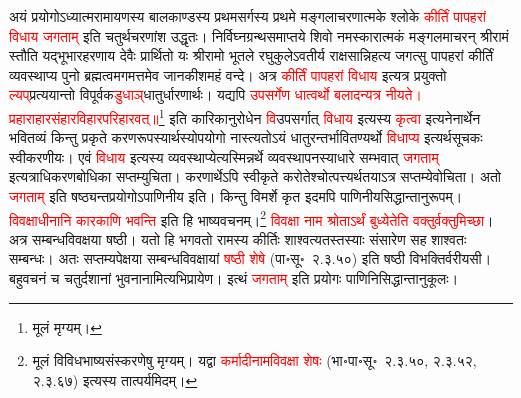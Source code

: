 \begin{sloppypar}\justifying\noindent\hspace{10mm} अयं प्रयोगोऽध्यात्म\-रामायणस्य बाल\-काण्डस्य प्रथम\-सर्गस्य प्रथमे मङ्गलाचरणात्मके श्लोके \textcolor{red}{कीर्तिं पाप\-हरां विधाय जगताम्‌} इति चतुर्थ\-चरणांश उद्धृतः। निर्विघ्न\-ग्रन्थ\-समाप्तये शिवो नमस्कारात्मकं मङ्गलमाचरन् श्रीरामं स्तौति यद्भू\-भार\-हरणाय देवैः प्रार्थितो यः श्रीरामो भूतले रघु\-कुलेऽवतीर्य राक्षसान्निहत्य जगत्सु पाप\-हरां कीर्तिं व्यवस्थाप्य पुनो ब्रह्मत्वमगमत्तमेव जानकीशमहं वन्दे। अत्र \textcolor{red}{कीर्तिं पाप\-हरां विधाय} इत्यत्र प्रयुक्तो \textcolor{red}{ल्यप्‌}\-प्रत्ययान्तो वि\-पूर्वक\textcolor{red}{डुधाञ्‌}\-धातुर्धारणार्थः। यद्यपि \textcolor{red}{उपसर्गेण धात्वर्थो बलादन्यत्र नीयते। प्रहाराहार\-संहार\-विहार\-परिहारवत्॥}\footnote{मूलं मृग्यम्।} इति कारिकानुरोधेन \textcolor{red}{वि}\-उपसर्गात् \textcolor{red}{विधाय} इत्यस्य \textcolor{red}{कृत्वा} इत्यनेनार्थेन भवितव्यं किन्तु प्रकृते करण\-रूपस्यार्थस्योप\-योगो नास्त्यतोऽयं धातुरन्तर्भावित\-ण्यर्थो \textcolor{red}{विधाप्य} इत्यर्थ\-सूचकः स्वीकरणीयः। एवं \textcolor{red}{विधाय} इत्यस्य व्यवस्थाप्येत्यस्मिन्नर्थे व्यवस्थापनस्याधारे सम्भवात् \textcolor{red}{जगताम्‌} इत्यत्राधिकरण\-बोधिका सप्तम्युचिता। करणार्थेऽपि स्वीकृते करोतेश्चोत्पत्त्यर्थतयाऽत्र
सप्तम्येवोचिता। अतो \textcolor{red}{जगताम्‌} इति षष्ठ्यन्त\-प्रयोगोऽपाणिनीय इति। किन्तु विमर्शे कृत इदमपि पाणिनीय\-सिद्धान्तानुरूपम्। \textcolor{red}{विवक्षाधीनानि कारकाणि भवन्ति} इति हि भाष्य\-वचनम्।\footnote{मूलं विविध\-भाष्य\-संस्करणेषु मृग्यम्। यद्वा \textcolor{red}{कर्मादीनामविवक्षा शेषः} (भा॰पा॰सू॰~२.३.५०, २.३.५२, २.३.६७) इत्यस्य तात्पर्यमिदम्।} \textcolor{red}{विवक्षा नाम श्रोताऽर्थं बुध्येतेति वक्तुर्वक्तुमिच्छा}। अत्र 
सम्बन्ध\-विवक्षया षष्ठी। यतो हि भगवतो रामस्य कीर्तिः शाश्वत्यतस्तस्याः संसारेण सह शाश्वतः सम्बन्धः। अतः सप्तम्यपेक्षया सम्बन्ध\-विवक्षायां \textcolor{red}{षष्ठी शेषे} (पा॰सू॰~२.३.५०) इति षष्ठी विभक्तिर्वरीयसी। बहुवचनं च चतुर्दशानां भुवनानामित्यभिप्रायेण। इत्थं \textcolor{red}{जगताम्‌} इति प्रयोगः पाणिनि\-सिद्धान्तानुकूलः।\end{sloppypar}

